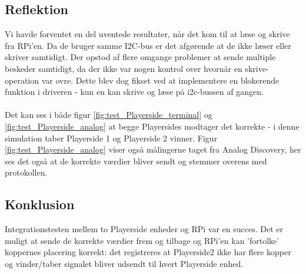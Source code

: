\documentclass[Integrationstest/Integrationstest_main.tex]{subfiles}
\begin{document}
\subsection{Reflektion}
Vi havde forventet en del uventede resultater, når det kom til at læse og skrive fra RPi'en. Da de bruger samme I2C-bus er det afgørende at de ikke læser eller skriver samtidigt. Der opstod af flere omgange problemer at sende multiple beskeder samtidigt, da der ikke var nogen kontrol over hvornår en skrive-operation var ovre. Dette blev dog fikset ved at implementere en blokerende funktion i driveren - kun en kan skrive og læse på i2c-bussen af gangen. \\\\
Det kan ses i både figur \ref{fig:test_Playerside_terminal} og \ref{fig:test_Playerside_analog} at begge Playersides modtager det korrekte - i denne simulation taber Playerside 1 og Playerside 2 vinner. Figur \ref{fig:test_Playerside_analog} viser også målingerne taget fra Analog Discovery, her ses det også at de korrekte værdier bliver sendt og stemmer overens med protokollen.
\subsection{Konklusion}
Integrationstesten mellem to Playerside enheder og RPi var en succes. Det er muligt at sende de korrekte værdier frem og tilbage og RPi'en kan 'fortolke' koppernes placering korrekt: det registreres at Playerside2 ikke har flere kopper og vinder/taber signalet bliver udsendt til hvert Playerside enhed.
\end{document}
